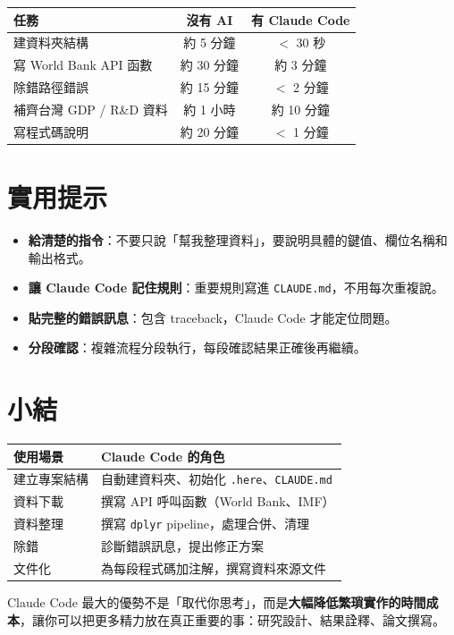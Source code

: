 \documentclass[12pt, a4paper]{article}
\begin{document}
\begin{center}
\begin{tabular}{lcc}
\toprule
\textbf{任務} & \textbf{沒有 AI} & \textbf{有 Claude Code} \\
\midrule
建資料夾結構 & 約 5 分鐘 & $<$ 30 秒 \\
寫 World Bank API 函數 & 約 30 分鐘 & 約 3 分鐘 \\
除錯路徑錯誤 & 約 15 分鐘 & $<$ 2 分鐘 \\
補齊台灣 GDP / R\&D 資料 & 約 1 小時 & 約 10 分鐘 \\
寫程式碼說明 & 約 20 分鐘 & $<$ 1 分鐘 \\
\bottomrule
\end{tabular}
\end{center}

\section{實用提示}

\begin{itemize}
  \item \textbf{給清楚的指令}：不要只說「幫我整理資料」，要說明具體的鍵值、欄位名稱和輸出格式。
  \item \textbf{讓 Claude Code 記住規則}：重要規則寫進 \texttt{CLAUDE.md}，不用每次重複說。
  \item \textbf{貼完整的錯誤訊息}：包含 traceback，Claude Code 才能定位問題。
  \item \textbf{分段確認}：複雜流程分段執行，每段確認結果正確後再繼續。
\end{itemize}

\section*{小結}

\begin{center}
\begin{tabular}{ll}
\toprule
\textbf{使用場景} & \textbf{Claude Code 的角色} \\
\midrule
建立專案結構 & 自動建資料夾、初始化 \texttt{.here}、\texttt{CLAUDE.md} \\
資料下載 & 撰寫 API 呼叫函數（World Bank、IMF） \\
資料整理 & 撰寫 \texttt{dplyr} pipeline，處理合併、清理 \\
除錯 & 診斷錯誤訊息，提出修正方案 \\
文件化 & 為每段程式碼加注解，撰寫資料來源文件 \\
\bottomrule
\end{tabular}
\end{center}

Claude Code 最大的優勢不是「取代你思考」，而是\textbf{大幅降低繁瑣實作的時間成本}，讓你可以把更多精力放在真正重要的事：研究設計、結果詮釋、論文撰寫。
\end{document}
